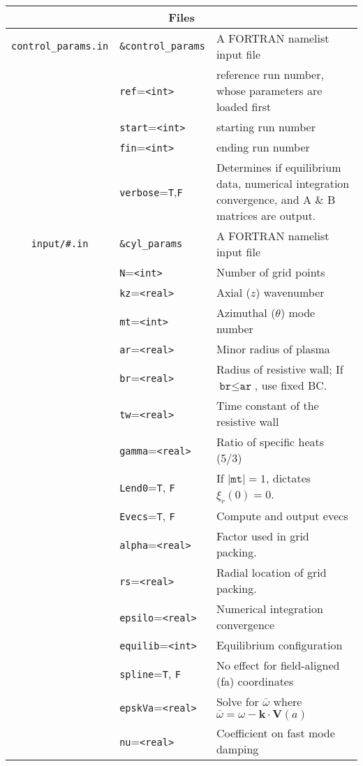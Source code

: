 \documentclass[letterpaper]{article}
\newcommand{\ttt}[1]{\texttt{#1}}
\newcommand{\typ}[1]{\ttt{<#1>}}
\newcommand{\typi}{\typ{int}}
\newcommand{\typr}{\typ{real}}
\newcommand{\tttr}[1]{\ttt{#1}=\typr}
\begin{document}
\begin{table}
  \begin{tabular}{|c|l|p{2.3in}|}
    \hline
    \multicolumn{3}{|c|}{Files} \\
    \hline
    \ttt{control\_params.in} &\ttt{\&control\_params}& A FORTRAN namelist input file   \\
    \cline{2-3}
    & \ttt{ref}=\typ{int} & reference run number, whose parameters are loaded first  \\
    & \ttt{start}=\typ{int} & starting run number \\
    & \ttt{fin}=\typ{int} & ending run number \\
    & \ttt{verbose}=\ttt{T},\ttt{F} & Determines if equilibrium data, numerical integration convergence, and A \& B matrices are output.  \\
    \hline
    \ttt{input/\#.in} & \ttt{\&cyl\_params} & A FORTRAN namelist input file\\
    \cline{2-3}
    & \ttt{N}=\typi & Number of grid points\\
    & \ttt{kz}=\typr & Axial ($z$) wavenumber\\
    & \ttt{mt}=\typi & Azimuthal ($\theta$) mode number \\
    & \ttt{ar}=\typr & Minor radius of plasma \\
    & \tttr{br} & Radius of resistive wall; If $\ttt{br}\le\ttt{ar}$, use fixed BC.\\
    & \tttr{tw} & Time constant of the resistive wall \\
    & \tttr{gamma} & Ratio of specific heats (5/3) \\
    & \ttt{Lend0}=\ttt{T}, \ttt{F} & If $|\ttt{mt}|=1$, dictates $\xi_r(0)=0$. \\ 
    & \ttt{Evecs}=\ttt{T}, \ttt{F} & Compute and output evecs \\ 
    & \tttr{alpha} & Factor used in grid packing. \\ 
    & \tttr{rs} & Radial location of grid packing. \\ 
    & \tttr{epsilo} & Numerical integration convergence \\
    & \ttt{equilib}=\typi & Equilibrium configuration \\
    & \ttt{spline}=\ttt{T}, \ttt{F} & No effect for field-aligned (fa) coordinates \\
    & \tttr{epskVa} & Solve for $\bar{\omega}$ where \mbox{$\bar{\omega}=\omega-\mathbf{k\cdot V}(a)$} \\
    & \tttr{nu} & Coefficient on fast mode damping \\

\end{tabular}
\end{table}
\end{document}
